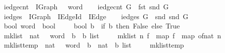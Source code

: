 \begin{isabellebody}
\ \ iedge{\isacharunderscore}cnt\ {\isacharcolon}{\isacharcolon}\ {\isachardoublequoteopen}IGraph\ {\isasymRightarrow}\ {}{}\ word{\isachardoublequoteclose}\isanewline
{}\ \isanewline
\ \ {\isachardoublequoteopen}iedge{\isacharunderscore}cnt\ G\ {\isasymequiv}\ fst\ {\isacharparenleft}snd\ G{\isacharparenright}{\isachardoublequoteclose}\isanewline
\isanewline
{}\isamarkupfalse%
\ \isanewline
\ \ iedges\ {\isacharcolon}{\isacharcolon}\ {\isachardoublequoteopen}IGraph\ {\isasymRightarrow}\ IEdge{\isacharunderscore}Id\ {\isasymRightarrow}\ IEdge{\isachardoublequoteclose}\isanewline
{}\ \isanewline
\ \ {\isachardoublequoteopen}iedges\ G\ {\isasymequiv}\ snd\ {\isacharparenleft}snd\ G{\isacharparenright}{\isachardoublequoteclose}\isanewline
\isanewline
\isanewline
{}\isamarkupfalse%
\ \isanewline
\ \ bool{\isacharcolon}{\isacharcolon}{\isachardoublequoteopen}{}{}\ word\ {\isasymRightarrow}\ bool{\isachardoublequoteclose}\ \isanewline
{}\ \isanewline
\ \ {\isachardoublequoteopen}bool\ b\ {\isacharequal}\ {\isacharparenleft}if\ b{\isacharequal}{}\ then\ False\ else\ True{\isacharparenright}{\isachardoublequoteclose}\isanewline
\isanewline
{}\isamarkupfalse%
\ \isanewline
\ \ mk{\isacharunderscore}list{\isacharprime}\ {\isacharcolon}{\isacharcolon}\ {\isachardoublequoteopen}nat\ {\isasymRightarrow}\ {\isacharparenleft}{}{}\ word\ {\isasymRightarrow}\ {\isacharprime}b{\isacharparenright}\ {\isasymRightarrow}\ {\isacharprime}b\ list{\isachardoublequoteclose}\ \isanewline
{}\ \isanewline
\ \ {\isachardoublequoteopen}mk{\isacharunderscore}list{\isacharprime}\ n\ f\ {\isacharequal}\ map\ f\ \ {\isacharparenleft}map\ of{\isacharunderscore}nat\ {\isacharbrackleft}{}{\isachardot}{\isachardot}{\isacharless}n{\isacharbrackright}{\isacharparenright}{\isachardoublequoteclose}\isanewline
\isanewline
{}\isamarkupfalse%
\ \isanewline
\ \ mk{\isacharunderscore}list{\isacharprime}{\isacharunderscore}temp\ {\isacharcolon}{\isacharcolon}\ {\isachardoublequoteopen}nat\ {\isasymRightarrow}\ {\isacharparenleft}{}{}\ word\ {\isasymRightarrow}\ {\isacharprime}b{\isacharparenright}\ {\isasymRightarrow}\ nat\ {\isasymRightarrow}\ {\isacharprime}b\ list{\isachardoublequoteclose}\ \isanewline
{}\ \isanewline
\ \ {\isachardoublequoteopen}mk{\isacharunderscore}list{\isacharprime}{\isacharunderscore}temp\ {}\ {\isacharunderscore}\ {\isacharunderscore}\ {\isacharequal}\ {\isacharbrackleft}{\isacharbrackright}{\isachardoublequoteclose}\ {\isacharbar}\isanewline

\end{isabellebody}
